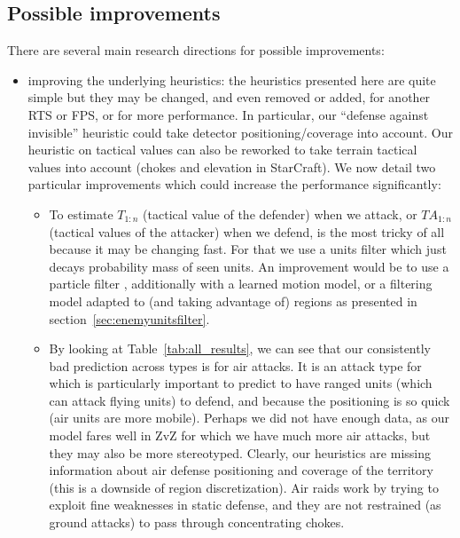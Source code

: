 \subsection{Possible improvements}
\label{sec:tacticspossibleimprovements}
There are several main research directions for possible improvements:
\begin{itemize}
    \item improving the underlying heuristics: the heuristics presented here are quite simple but they may be changed, and even removed or added, for another RTS or FPS, or for more performance. In particular, our ``defense against invisible'' heuristic could take detector positioning/coverage into account. Our heuristic on tactical values can also be reworked to take terrain tactical values into account (chokes and elevation in StarCraft). %
We now detail two particular improvements which could increase the performance significantly:
\begin{itemize}
    \item To estimate $T_{1:n}$ (tactical value of the defender) when we attack, or $TA_{1:n}$ (tactical values of the attacker) when we defend, is the most tricky of all because it may be changing fast. For that we use a units filter which just decays probability mass of seen units. An improvement would be to use a particle filter \cite{weber2011aiide}, additionally with a learned motion model, or a filtering model adapted to (and taking advantage of) regions as presented in section~\ref{sec:enemyunitsfilter}. 
    \item By looking at Table~\ref{tab:all_results}, we can see that our consistently bad prediction across types is for air attacks. It is an attack type for which is particularly important to predict to have ranged units (which can attack flying units) to defend, and because the positioning is so quick (air units are more mobile). Perhaps we did not have enough data, as our model fares well in ZvZ for which we have much more air attacks, but they may also be more stereotyped. Clearly, our heuristics are missing information about air defense positioning and coverage of the territory (this is a downside of region discretization). Air raids work by trying to exploit fine weaknesses in static defense, and they are not restrained (as ground attacks) to pass through concentrating chokes.
\end{itemize}

\end{itemize}
